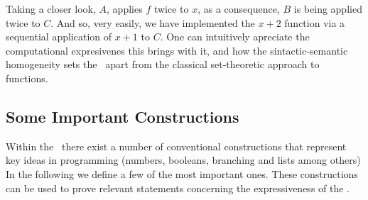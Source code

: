 \documentclass[12pt]{book}
\begin{document}
Taking a closer look, $A$, applies $f$ twice to $x$, as a consequence, $B$ is being applied twice to $C$. And so, very easily, we have implemented the $ x + 2 $ function via a sequential application of $x + 1$ to $C$. One can intuitively apreciate the computational expresivenes this brings with it, and how the sintactic-semantic homogeneity sets the \lcalc \ apart from the classical set-theoretic approach to functions.


\subsection{\centering Some Important Constructions}

Within the \lcalc \ there exist a number of conventional constructions that represent key ideas in programming (numbers, booleans, branching and lists among others) In the following we define a few of the most important ones. These constructions can be used to prove relevant statements concerning the expressiveness of the \lcalc.
\end{document}
